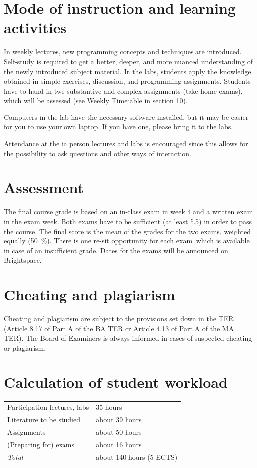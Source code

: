 \documentclass[a4paper,12pt]{article}
\begin{document}
\section{Mode of instruction and learning activities}
In weekly lectures,
new programming concepts and techniques are introduced. Self-study is
required to get a better, deeper, and more nuanced understanding of the newly
introduced subject material. In the labs, students apply the knowledge obtained
in simple exercises, discussion, and programming assignments. Students have to
hand in two substantive and complex assignments (take-home exams), which will
be assessed (see Weekly Timetable in section 10). %

Computers in the lab have the necessary software installed, but it may be
easier for you to use your own laptop. If you have one, please bring it to
the labs.

Attendance at the in person lectures and labs is encouraged since this allows for
the possibility to ask questions and other ways of interaction.

\section{Assessment}
The final course grade is based on an in-class exam in week 4 and a written
exam in the exam week.
Both exams have to be sufficient (at least 5.5) in order to
pass the course. The final score is the mean of the grades for the two exams,
weighted equally (50~\%). There is one re-sit opportunity for each exam, which
is available in case of an insufficient grade.
Dates for the exams will be announced on Brightspace.

\section{Cheating and plagiarism}
Cheating and plagiarism are subject to the provisions set down in the TER
(Article 8.17 of Part A of the BA TER or Article 4.13 of Part A of the MA TER).
The Board of Examiners is always informed in cases of suspected cheating or
plagiarism.

\section{Calculation of student workload}
\begin{tabular}{ll}
    Participation lectures, labs   & 35 hours \\
    Literature to be studied       & about 39 hours \\
    Assignments                    & about 50 hours \\
    (Preparing for) exams          & about 16 hours \\
    \emph{Total}                   & about 140 hours (5 ECTS) \\
\end{tabular}
\end{document}
